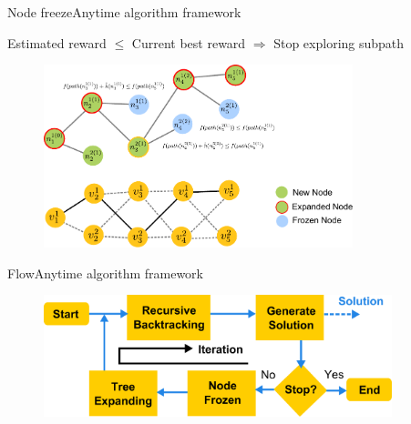 \begin{frame}{Node freeze}{Anytime algorithm framework}
	
	
	Estimated reward $ \leq $ Current best reward 
	$ \Longrightarrow $ Stop exploring subpath
	
	\begin{figure}
		\centering
		\includegraphics[width =  0.8\textwidth]{./figure/freeze_process}
	\end{figure}
	
\end{frame}

\begin{frame}{Flow}{Anytime algorithm framework}
	
	\begin{figure}
		\centering
		\includegraphics[width = 0.9\textwidth]{./figure/alg_flow}
	\end{figure}
	
\end{frame}

